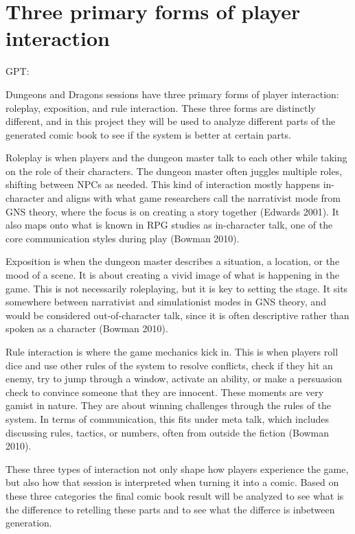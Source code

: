 \section{Three primary forms of player interaction}
GPT:

Dungeons and Dragons sessions have three primary forms of player interaction: roleplay, exposition, and rule interaction. These three forms are distinctly different, and in this project they will be used to analyze different parts of the generated comic book to see if the system is better at certain parts.

Roleplay is when players and the dungeon master talk to each other while taking on the role of their characters. The dungeon master often juggles multiple roles, shifting between NPCs as needed. This kind of interaction mostly happens in-character and aligns with what game researchers call the narrativist mode from GNS theory, where the focus is on creating a story together (Edwards 2001). It also maps onto what is known in RPG studies as in-character talk, one of the core communication styles during play (Bowman 2010).

Exposition is when the dungeon master describes a situation, a location, or the mood of a scene. It is about creating a vivid image of what is happening in the game. This is not necessarily roleplaying, but it is key to setting the stage. It sits somewhere between narrativist and simulationist modes in GNS theory, and would be considered out-of-character talk, since it is often descriptive rather than spoken as a character (Bowman 2010).

Rule interaction is where the game mechanics kick in. This is when players roll dice and use other rules of the system to resolve conflicts, check if they hit an enemy, try to jump through a window, activate an ability, or make a persuasion check to convince someone that they are innocent. These moments are very gamist in nature. They are about winning challenges through the rules of the system. In terms of communication, this fits under meta talk, which includes discussing rules, tactics, or numbers, often from outside the fiction (Bowman 2010).

These three types of interaction not only shape how players experience the game, but also how that session is interpreted when turning it into a comic. Based on these three categories the final comic book result will be analyzed to see what is the difference to retelling these parts and to see what the differce is inbetween generation.